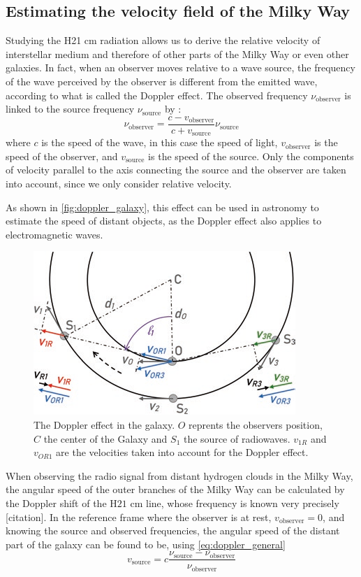 \subsection{Estimating the velocity field of the Milky Way}
Studying the H21 cm radiation allows us to derive the relative velocity of interstellar medium and therefore of other parts of the Milky Way or even other galaxies.
In fact, when an observer moves relative to a wave source, the frequency of the wave perceived by the observer is different from the emitted wave, according to what is called the Doppler effect.
The observed frequency $\nu_\textrm{observer}$ is linked to the source frequency $\nu_\textrm{source}$ by \cite{alonso_fundamental_1983}:
\begin{equation}
    \nu_\textrm{observer} = \frac{c - v_\textrm{observer}}{c + v_\textrm{source}} \nu_\textrm{source}
    \label{eq:doppler_general}
\end{equation}
where $c$ is the speed of the wave, in this case the speed of light, $v_\textrm{observer}$ is the speed of the observer, and $v_\textrm{source}$ is the speed of the source.
Only the components of velocity parallel to the axis connecting the source and the observer are taken into account, since we only consider relative velocity.

As shown in \autoref{fig:doppler_galaxy}, this effect can be used in astronomy to estimate the speed of distant objects, as the Doppler effect also applies to electromagnetic waves.
\begin{figure}[htbp]
    \centering
    \includegraphics[width=0.6\linewidth]{figures/doppler_galaxy.png}
    \caption{The Doppler effect in the galaxy. $O$ reprents the observers position, $C$ the center of the Galaxy and $S_1$ the source of radiowaves. $v_{1R}$ and $v_{OR1}$ are the velocities taken into account for the Doppler effect. \cite{lauterbach_radio_2022}}
    \label{fig:doppler_galaxy}
\end{figure}
When observing the radio signal from distant hydrogen clouds in the Milky Way, the angular speed of the outer branches of the Milky Way can be calculated by the Doppler shift of the H$21$ cm line, whose frequency is known very precisely [citation].
In the reference frame where the observer is at rest, $v_\textrm{observer} = 0$, and knowing the source and observed frequencies, the angular speed of the distant part of the galaxy can be found to be, using \autoref{eq:doppler_general}
\begin{equation}
    v_\textrm{source} = c \frac{\nu_\textrm{source} - \nu_\textrm{observer}}{\nu_\textrm{observer}}
    \label{eq:doppler}
\end{equation}

